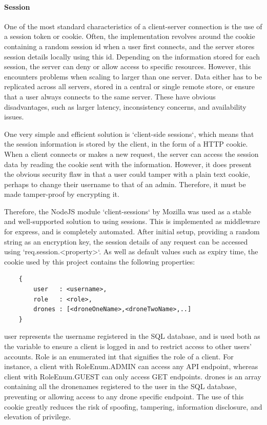 \documentclass{article}
\begin{document}
\paragraph{Session}
One of the most standard characteristics of a client-server connection is the use of a session token or cookie. Often, the implementation revolves around the cookie containing a random session id when a user first connects, and the server stores session details locally using this id.  Depending on the information stored for each session, the server can deny or allow access to specific resources. However, this encounters problems when scaling to larger than one server. Data either has to be replicated across all servers, stored in a central or single remote store, or ensure that a user always connects to the same server\cite{mozillaClientSessions}. These have obvious disadvantages, such as larger latency, inconsistency concerns, and availability issues. 

One very simple and efficient solution is `client-side sessions`, which means that the session information is stored by the client, in the form of a HTTP cookie. When a client connects or makes a new request, the server can access the session data by reading the cookie sent with the information. However, it does present the obvious security flaw in that a user could tamper with a plain text cookie, perhaps to change their username to that of an admin. Therefore, it must be made tamper-proof by encrypting it\cite{mozillaClientSessions}. 

Therefore, the NodeJS module `client-sessions` by Mozilla was used as a stable and well-supported solution to using sessions\cite{client-sessions}. This is implemented as middleware for express, and is completely automated. After initial setup, providing a random string as an encryption key, the session details of any request can be accessed using `req.session.\textless property\textgreater`. As well as default values such as expiry time, the cookie used by this project contains the following properties:
\begin{center}
\begin{lstlisting}
	{
		user   : <username>,
		role   : <role>,
		drones : [<droneOneName>,<droneTwoName>,..]
	}
\end{lstlisting}
\end{center}
user represents the username registered in the SQL database, and is used both as the variable to ensure a client is logged in and to restrict access to other users' accounts. Role is an enumerated int that signifies the role of a client. For instance, a client with RoleEnum.ADMIN can access any API endpoint, whereas client with RoleEnum.GUEST can only access GET endpoints. drones is an array containing all the dronenames registered to the user in the SQL database, preventing or allowing access to any drone specific endpoint. The use of this cookie greatly reduces the risk of spoofing, tampering, information disclosure, and elevation of privilege. 
\end{document}
